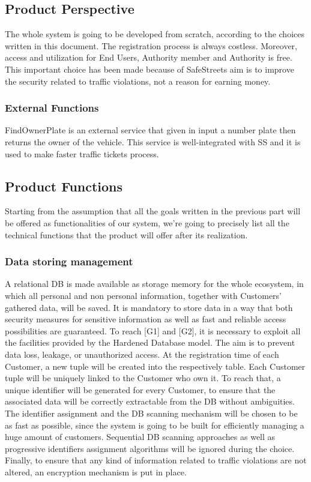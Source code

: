 \documentclass[12pt]{article}
\begin{document}
\subsection{Product Perspective}
\vspace{5mm}

The whole system is going to be developed from scratch, according to the choices written in this document. The registration process is always costless. Moreover, access and utilization for End Users, Authority member and Authority is free. This important choice has been made because of SafeStreets aim is to improve the security related to traffic violations, not a reason for earning money. 

\subsubsection{External Functions}
\vspace{2mm}

FindOwnerPlate is an external service that given in input a number plate then returns the owner of the vehicle. This service is well-integrated with SS and it is used to make faster traffic tickets process. 
\subsection{Product Functions}
Starting from the assumption that all the goals written in the previous part will be offered as functionalities of our system, we’re going to precisely list all the technical functions that the product will offer after its realization. 

\newpage

\subsubsection{Data storing management}
\vspace{5mm}
A relational DB is made available as storage memory for the whole ecosystem, in which all personal and non personal information, together with Customers’ gathered data, will be saved. It is mandatory to store data in a way that both security measures for sensitive information as well as fast and reliable access possibilities are guaranteed. To reach [G1] and [G2], it is necessary to exploit all the facilities provided by the Hardened Database model. The aim is to prevent data loss, leakage, or unauthorized access. At the registration time of each Customer, a new tuple will be created into the respectively table. Each Customer tuple will be uniquely linked to the Customer who own it. To reach that, a unique identifier will be generated for every Customer, to ensure that the associated data will be correctly extractable from the DB without ambiguities. The identifier assignment and the DB scanning mechanism will be chosen to be as fast as possible, since the system is going to be built for efficiently managing a huge amount of customers. Sequential DB scanning approaches as well as progressive identifiers assignment algorithms will be ignored during the choice. Finally, to ensure that any kind of information related to traffic violations are not altered, an encryption mechanism is put in place.
\end{document}
